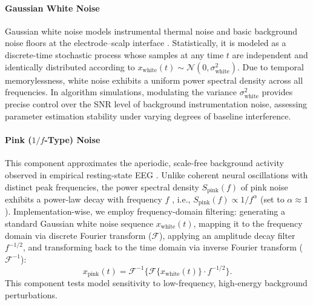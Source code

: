 \documentclass[11pt]{article}
\begin{document}
\paragraph{Gaussian White Noise}
Gaussian white noise models instrumental thermal noise and basic background noise floors at the electrode--scalp interface \citep{uriguen2015eeg}. Statistically, it is modeled as a discrete-time stochastic process whose samples at any time $t$ are independent and identically distributed according to $x_{\mathrm{white}}(t) \sim \mathcal{N}(0, \sigma_{\mathrm{white}}^2)$. Due to temporal memorylessness, white noise exhibits a uniform power spectral density across all frequencies. In algorithm simulations, modulating the variance $\sigma_{\mathrm{white}}^2$ provides precise control over the SNR level of background instrumentation noise, assessing parameter estimation stability under varying degrees of baseline interference.

\paragraph{Pink ($1/f$-Type) Noise}
This component approximates the aperiodic, scale-free background activity observed in empirical resting-state EEG \citep{he2014scale}. Unlike coherent neural oscillations with distinct peak frequencies, the power spectral density $S_{\mathrm{pink}}(f)$ of pink noise exhibits a power-law decay with frequency $f$ \citep{donoghue2020parameterizing}, i.e., $S_{\mathrm{pink}}(f) \propto 1/f^\alpha$ (set to $\alpha \approx 1$). Implementation-wise, we employ frequency-domain filtering: generating a standard Gaussian white noise sequence $x_{\mathrm{white}}(t)$, mapping it to the frequency domain via discrete Fourier transform ($\mathcal{F}$), applying an amplitude decay filter $f^{-1/2}$, and transforming back to the time domain via inverse Fourier transform ($\mathcal{F}^{-1}$):
\begin{equation}
x_{\mathrm{pink}}(t) = \mathcal{F}^{-1}\{\mathcal{F}\{x_{\mathrm{white}}(t)\} \cdot f^{-1/2}\}. \tag{S6.5}\label{eq:supp_pink}
\end{equation}
This component tests model sensitivity to low-frequency, high-energy background perturbations.
\end{document}
